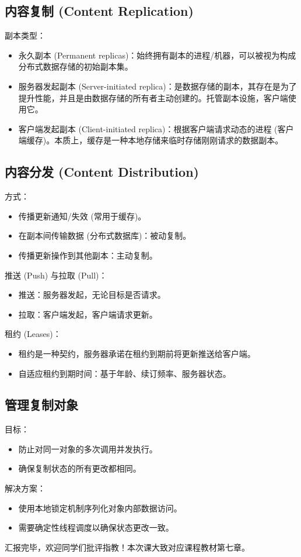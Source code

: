 \subsection{内容复制 (Content Replication)}

副本类型：
\begin{itemize}
\item 永久副本 (Permanent replicas)：始终拥有副本的进程/机器，可以被视为构成分布式数据存储的初始副本集。
\item 服务器发起副本 (Server-initiated replica)：是数据存储的副本，其存在是为了提升性能，并且是由数据存储的所有者主动创建的。托管副本设施，客户端使用它。
\item 客户端发起副本 (Client-initiated replica)：根据客户端请求动态的进程 (客户端缓存)。本质上，缓存是一种本地存储来临时存储刚刚请求的数据副本。
\end{itemize}

\subsection{内容分发 (Content Distribution)}

方式：
\begin{itemize}
\item 传播更新通知/失效 (常用于缓存)。
\item 在副本间传输数据 (分布式数据库)：被动复制。
\item 传播更新操作到其他副本：主动复制。
\end{itemize}

推送 (Push) 与拉取 (Pull)：
\begin{itemize}
\item 推送：服务器发起，无论目标是否请求。
\item 拉取：客户端发起，客户端请求更新。
\end{itemize}

租约 (Leases)：
\begin{itemize}
\item 租约是一种契约，服务器承诺在租约到期前将更新推送给客户端。
\item 自适应租约到期时间：基于年龄、续订频率、服务器状态。
\end{itemize}

\subsection{管理复制对象}

目标：
\begin{itemize}
\item 防止对同一对象的多次调用并发执行。
\item 确保复制状态的所有更改都相同。
\end{itemize}

解决方案：
\begin{itemize}
\item 使用本地锁定机制序列化对象内部数据访问。
\item 需要确定性线程调度以确保状态更改一致。
\end{itemize}

汇报完毕，欢迎同学们批评指教！本次课大致对应课程教材第七章。

